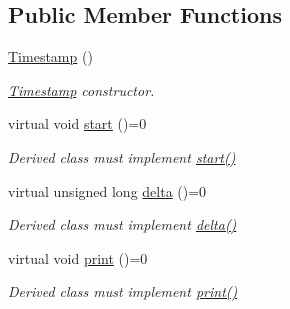 \subsection*{Public Member Functions}
\begin{DoxyCompactItemize}
\item 
\hyperlink{class_timestamp_a2e610487ef16d9d5a8d6dc8ad457a3e7}{Timestamp} ()\hypertarget{class_timestamp_a2e610487ef16d9d5a8d6dc8ad457a3e7}{}\label{class_timestamp_a2e610487ef16d9d5a8d6dc8ad457a3e7}

\begin{DoxyCompactList}\small\item\em \hyperlink{class_timestamp}{Timestamp} constructor. \end{DoxyCompactList}\item 
virtual void \hyperlink{class_timestamp_a4aa0acbd36d3e022b3e7e43bc4d9b5db}{start} ()=0\hypertarget{class_timestamp_a4aa0acbd36d3e022b3e7e43bc4d9b5db}{}\label{class_timestamp_a4aa0acbd36d3e022b3e7e43bc4d9b5db}

\begin{DoxyCompactList}\small\item\em Derived class must implement \hyperlink{class_timestamp_a4aa0acbd36d3e022b3e7e43bc4d9b5db}{start()} \end{DoxyCompactList}\item 
virtual unsigned long \hyperlink{class_timestamp_afa237f41af2043b2f5d6e0733d595c21}{delta} ()=0\hypertarget{class_timestamp_afa237f41af2043b2f5d6e0733d595c21}{}\label{class_timestamp_afa237f41af2043b2f5d6e0733d595c21}

\begin{DoxyCompactList}\small\item\em Derived class must implement \hyperlink{class_timestamp_afa237f41af2043b2f5d6e0733d595c21}{delta()} \end{DoxyCompactList}\item 
virtual void \hyperlink{class_timestamp_a62b55270dae36ad337c87ae30eeb2fb9}{print} ()=0\hypertarget{class_timestamp_a62b55270dae36ad337c87ae30eeb2fb9}{}\label{class_timestamp_a62b55270dae36ad337c87ae30eeb2fb9}

\begin{DoxyCompactList}\small\item\em Derived class must implement \hyperlink{class_timestamp_a62b55270dae36ad337c87ae30eeb2fb9}{print()} \end{DoxyCompactList}\end{DoxyCompactItemize}
